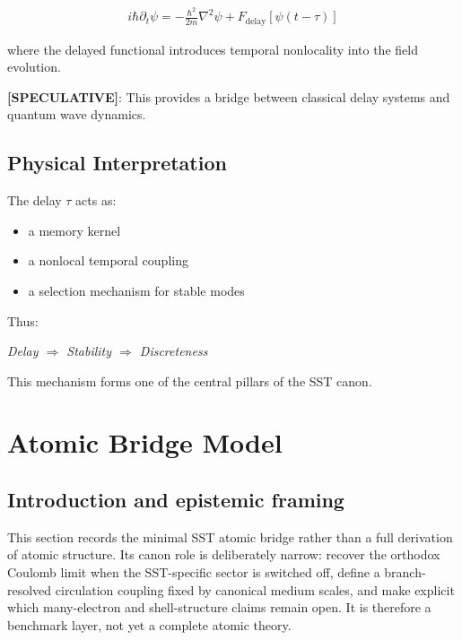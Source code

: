 \documentclass[11pt]{article}
\theoremstyle{definition}
\theoremstyle{plain}
\theoremstyle{remark}
\begin{document}
        \begin{align}
            i \hbar \partial_t \psi = -\frac{\hbar^2}{2m} \nabla^2 \psi + F_{\text{delay}}[\psi(t - \tau)]
        \end{align}
        
        where the delayed functional introduces temporal nonlocality into the field evolution.
        
        \textbf{[SPECULATIVE]}: This provides a bridge between classical delay systems and quantum wave dynamics.
    
    \subsection{Physical Interpretation}
        
        The delay $\tau$ acts as:
        
        \begin{itemize}
            \item a memory kernel
            \item a nonlocal temporal coupling
            \item a selection mechanism for stable modes
        \end{itemize}
        
        Thus:
        
        \begin{center}
            \textit{Delay $\Rightarrow$ Stability $\Rightarrow$ Discreteness}
        \end{center}
        
        This mechanism forms one of the central pillars of the SST canon.

        
\section{Atomic Bridge Model}
    \label{sec:atomic}

    \subsection{Introduction and epistemic framing}
        This section records the minimal SST atomic bridge rather than a full derivation of atomic structure. Its canon role is deliberately narrow: recover the orthodox Coulomb limit when the SST-specific sector is switched off, define a branch-resolved circulation coupling fixed by canonical medium scales, and make explicit which many-electron and shell-structure claims remain open. It is therefore a benchmark layer, not yet a complete atomic theory.
    
\end{document}
